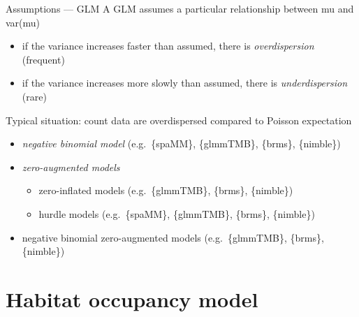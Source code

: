 \documentclass[
  10pt,
  ignorenonframetext,
  aspectratio=169,
  t]{beamer}
\providecommand{\tightlist}{%
  \setlength{\itemsep}{0pt}\setlength{\parskip}{0pt}}
\newcommand{\blueit}[1]{\textcolor{bluebeamer}{\emph{#1}}}
\begin{document}
\begin{frame}{Assumptions --- GLM}
\protect{}\label{assumptions-glm-2}
A GLM assumes a particular relationship between mu and var(mu)

\begin{itemize}
\item
  if the variance increases faster than assumed, there is
  \blueit{overdispersion} (frequent)
\item
  if the variance increases more slowly than assumed, there is
  \blueit{underdispersion} (rare)
\end{itemize}

\pause

\vspace{1em}

Typical situation: count data are overdispersed compared to Poisson
expectation

\begin{itemize}
\item
  \blueit{negative binomial model} (e.g.~\{spaMM\}, \{glmmTMB\},
  \{brms\}, \{nimble\})
\item
  \blueit{zero-augmented models}

  \begin{itemize}
  \tightlist
  \item
    zero-inflated models (e.g.~\{glmmTMB\}, \{brms\}, \{nimble\})
  \item
    hurdle models (e.g.~\{spaMM\}, \{glmmTMB\}, \{brms\}, \{nimble\})
  \end{itemize}
\item
  negative binomial zero-augmented models (e.g.~\{glmmTMB\}, \{brms\},
  \{nimble\})
\end{itemize}
\end{frame}

\section{Habitat occupancy model}\label{habitat-occupancy-model}
\end{document}
